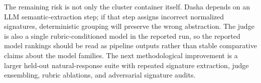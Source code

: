The remaining risk is not only the cluster container itself. Dasha depends on an
LLM semantic-extraction step; if that step assigns incorrect normalized
signatures, deterministic grouping will preserve the wrong abstraction. The
judge is also a single rubric-conditioned model in the reported run, so the
reported model rankings should be read as pipeline outputs rather than stable
comparative claims about the model families. The next methodological improvement is a
larger held-out natural-response suite with repeated signature extraction, judge
ensembling, rubric ablations, and adversarial signature audits.
